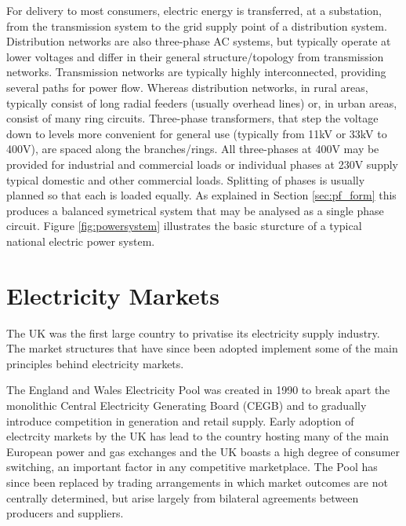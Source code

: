 

For delivery to most consumers, electric energy is transferred, at a
substation, from the transmission system to the grid supply point of a distribution
system.  Distribution networks are also three-phase AC systems, but
typically operate at lower voltages and differ in their general
structure/topology from transmission networks.  Transmission networks are
typically highly interconnected, providing several paths for power flow.
Whereas distribution networks, in rural areas, typically consist of long radial
feeders (usually overhead lines) or, in urban areas, consist of many ring
circuits.  Three-phase transformers, that step the voltage down to levels
more convenient for general use (typically from 11kV or 33kV to 400V), are spaced along the branches/rings. All three-phases at 400V may be provided for industrial and commercial loads
or individual phases at 230V supply typical domestic and other commercial
loads. Splitting of phases is usually planned so that each is loaded equally.
As explained in Section \ref{sec:pf_form} this produces a balanced
symetrical system that may be analysed as a single phase circuit. Figure
\ref{fig:powersystem} illustrates the basic sturcture of a typical national
electric power system.

\section{Electricity Markets}
The UK was the first large country to privatise its electricity
supply industry.  The market structures that have since been adopted
implement some of the main principles behind electricity markets.

The England and Wales Electricity Pool was created in 1990 to break apart the
monolithic Central Electricity Generating Board (CEGB) and to gradually
introduce competition in generation and retail supply.  Early adoption of
electrcity markets by the UK has lead to the country hosting many of the
main European power and gas exchanges and the UK boasts a high degree
of consumer switching, an important factor in any competitive marketplace. The
Pool has since been replaced by trading arrangements in which market outcomes
are not centrally determined, but arise largely from bilateral agreements
between producers and suppliers.

